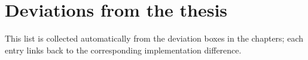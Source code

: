 \chapter{Deviations from the thesis}\label{app:deviations}
This list is collected automatically from the deviation boxes in the chapters;
each entry links back to the corresponding implementation difference.
\listdeviations
